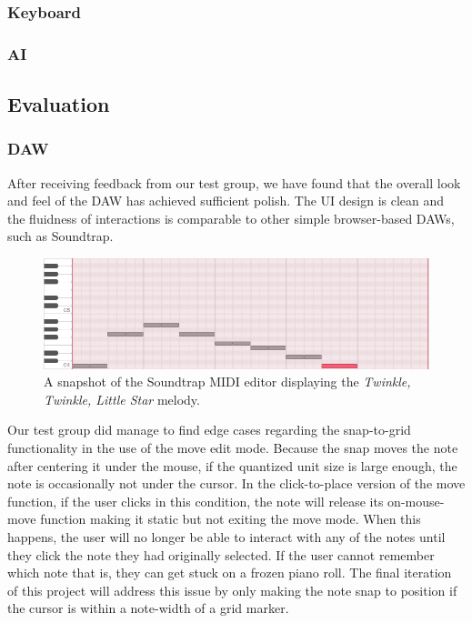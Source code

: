\subsubsection{Keyboard}

\blindtext

\subsubsection{AI}

\blindtext

\subsection{Evaluation}

\subsubsection{DAW}

After receiving feedback from our test group, we have found that the overall look and feel of the
DAW has achieved sufficient polish. The UI design is clean and the fluidness of interactions is
comparable to other simple browser-based DAWs, such as Soundtrap.

\begin{figure}[h!]
  \centering
  \includegraphics[width=\linewidth]{image/Soundtrap.png}
  \caption{A snapshot of the Soundtrap MIDI editor displaying the \textit{Twinkle, Twinkle, Little Star} melody.}
  \label{fig:soundtrap}
\end{figure}

Our test group did manage to find edge cases regarding the snap-to-grid functionality in the use
of the move edit mode. Because the snap moves the note after centering it under the mouse, if the
quantized unit size is large enough, the note is occasionally not under the cursor. In the
click-to-place version of the move function, if the user clicks in this condition, the note will
release its on-mouse-move function making it static but not exiting the move mode. When this
happens, the user will no longer be able to interact with any of the notes until they click the
note they had originally selected. If the user cannot remember which note that is, they can get
stuck on a frozen piano roll. The final iteration of this project will address this issue by only
making the note snap to position if the cursor is within a note-width of a grid marker.

